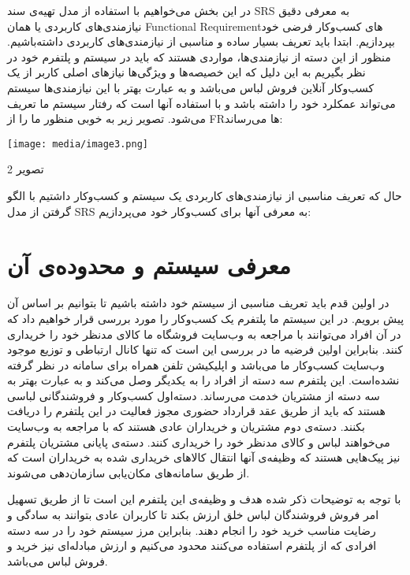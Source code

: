 \documentclass[]{article}
\begin{document}
در این بخش می‌خواهیم با استفاده از مدل تهیه‌ی سند SRS به معرفی دقیق
نیازمندی‌های کاربردی یا همان Functional Requirementهای کسب‌وکار فرضی خود
بپردازیم. ابتدا باید تعریف بسیار ساده و مناسبی از نیازمندی‌های کاربردی
داشته‌باشیم. منظور از این دسته از نیازمندی‌ها، مواردی هستند که باید در
سیستم و پلتفرم خود در نظر بگیریم به این دلیل که این خصیصه‌ها و ویژگی‌ها
نیازهای اصلی کاربر از یک کسب‌وکار آنلاین فروش لباس می‌باشد و به عبارت
بهتر با این نیاز‌مندی‌ها سیستم می‌تواند عمکلرد خود را داشته باشد و با
استفاده آنها است که رفتار سیستم ما تعریف می‌شود. تصویر زیر به خوبی منظور
ما را از FRها می‌رساند:

\texttt{[image: media/image3.png]}

تصویر 2

حال که تعریف مناسبی از نیازمندی‌های کاربردی یک سیستم و کسب‌وکار داشتیم
با الگو گرفتن از مدل SRS به معرفی آنها برای کسب‌وکار خود می‌پردازیم:

\section{معرفی سیستم و محدوده‌ی
آن}\label{ux645ux639ux631ux641ux6cc-ux633ux6ccux633ux62aux645-ux648-ux645ux62dux62fux648ux62fux647ux6cc-ux622ux646}

در اولین قدم باید تعریف مناسبی از سیستم خود داشته باشیم تا بتوانیم بر
اساس آن پیش برویم. در این سیستم ما پلتفرم یک کسب‌وکار را مورد بررسی قرار
خواهیم داد که در آن افراد می‌توانند با مراجعه به وب‌سایت فروشگاه ما
کالای مدنظر خود را خریداری کنند. بنابراین اولین فرضیه ما در بررسی این
است که تنها کانال ارتباطی و توزیع موجود وب‌سایت کسب‌وکار ما می‌باشد و
اپلیکیشن تلفن همراه برای سامانه در نظر گرفته نشده‌است. این پلتفرم سه
دسته از افراد را به یکدیگر وصل می‌کند و به عبارت بهتر به سه دسته از
مشتریان خدمت می‌رساند. دسته‌اول کسب‌وکار و فروشندگانی لباسی هستند که
باید از طریق عقد قرارداد حضوری مجوز فعالیت در این پلتفرم را دریافت
بکنند. دسته‌ی دوم مشتریان و خریداران عادی هستند که با مراجعه به وب‌سایت
می‌خواهند لباس و کالای مدنظر خود را خریداری کنند. دسته‌ی پایانی مشتریان
پلتفرم نیز پیک‌هایی هستند که وظیفه‌ی آنها انتقال کالاهای خریداری شده به
خریداران است که از طریق سامانه‌های مکان‌یابی سازمان‌دهی می‌شوند.

با توجه به توضیحات ذکر شده هدف و وظیفه‌ی این پلتفرم این است تا از طریق
تسهیل امر فروش فروشندگان لباس خلق ارزش بکند تا کاربران عادی بتوانند به
سادگی و رضایت مناسب خرید خود را انجام دهند. بنابراین مرز سیستم خود را در
سه دسته افرادی که از پلتفرم استفاده می‌کنند محدود می‌کنیم و ارزش
مبادله‌ای نیز خرید و فروش لباس می‌باشد.
\end{document}
